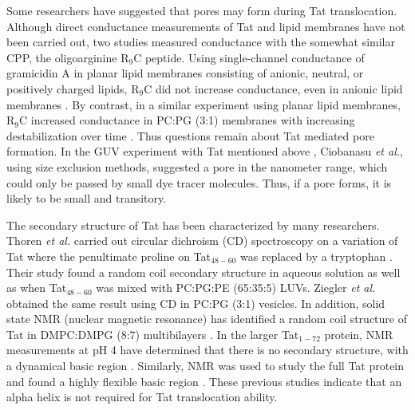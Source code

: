 Some researchers have suggested that pores may form during Tat translocation.
Although direct conductance 
measurements of Tat and lipid membranes have not been carried out, two studies 
measured conductance with the somewhat similar CPP, the oligoarginine R$_9$C peptide. 
Using single-channel conductance of gramicidin A in planar lipid membranes 
consisting of anionic, neutral, or positively charged lipids, R$_9$C did not 
increase conductance, even in anionic lipid membranes \cite{Gurnev13}. 
By contrast, in a similar experiment using planar lipid membranes, 
R$_9$C increased conductance in PC:PG (3:1) membranes with increasing destabilization 
over time \cite{Herce09}. 
Thus questions remain about Tat mediated pore formation. 
In the GUV experiment with Tat mentioned above \cite{Ciobanasu10},
Ciobanasu \textit{et al.}, using size exclusion methods, suggested a pore in the 
nanometer range, which could only be passed by small dye tracer molecules. Thus, 
if a pore forms, it is likely to be small and transitory.

The secondary structure of Tat has been characterized by many researchers. 
Thoren \textit{et al.} carried out circular dichroism (\acs{CD}) spectroscopy on a 
variation of Tat where the penultimate proline on Tat$_{48-60}$ was replaced by a
tryptophan \cite{Thoren04}. 
Their study found a random coil secondary structure 
in aqueous solution as well as when Tat$_{48-60}$ was mixed with PC:PG:PE (65:35:5) LUVs. 
Ziegler \textit{et al.} \cite{Ziegler05} obtained the same result using CD in 
PC:PG (3:1) vesicles. In addition, solid state \acs{NMR} (nuclear magnetic resonance) has identified a random coil 
structure of Tat in DMPC:DMPG (8:7) multibilayers \cite{Su10}. 
In the larger Tat$_{1-72}$ protein, NMR measurements at pH 4 have determined that there 
is no secondary structure, with a dynamical basic region \cite{Shojania06}. 
Similarly, NMR was used to study the full Tat protein and found a highly 
flexible basic region \cite{Bayer95}. These previous studies indicate that 
an alpha helix is not required for Tat translocation ability. 

